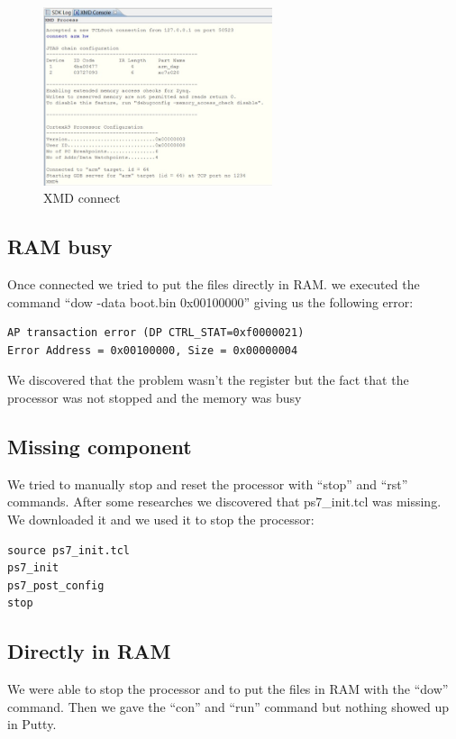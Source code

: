 \begin{figure}[h]
	\centering		\includegraphics[width=0.6\textwidth]{img/xmdconnect}
	\caption{XMD connect}
    	\label{fig:xmdconnect}
\end{figure}


\subsection{RAM busy}
Once connected we tried to put the files directly in RAM. we executed the command “dow -data boot.bin 0x00100000” giving us the following error:

\begin{lstlisting}[style=myCode]
AP transaction error (DP CTRL_STAT=0xf0000021)
Error Address = 0x00100000, Size = 0x00000004
\end{lstlisting}

We discovered that the problem wasn’t the register but the fact that the processor was not stopped and the memory was busy

\subsection{Missing component}
We tried to manually stop and reset the processor with “stop” and “rst” commands. After some researches we discovered that ps7\_init.tcl was missing. We downloaded it and we used it to stop the processor:


\begin{lstlisting}[style=myCode]
source ps7_init.tcl
ps7_init
ps7_post_config
stop
\end{lstlisting}

\subsection{Directly in RAM}
We were able to stop the processor and to put the files in RAM with the “dow” command. Then we gave the “con”  and “run” command but nothing showed up in Putty. 

